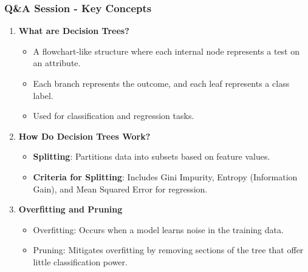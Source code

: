 \documentclass[aspectratio=169]{beamer}
\begin{document}
\begin{frame}[fragile]
    \frametitle{Q\&A Session - Key Concepts}
    \begin{enumerate}
        \item \textbf{What are Decision Trees?}
        \begin{itemize}
            \item A flowchart-like structure where each internal node represents a test on an attribute.
            \item Each branch represents the outcome, and each leaf represents a class label.
            \item Used for classification and regression tasks.
        \end{itemize}
        
        \item \textbf{How Do Decision Trees Work?}
        \begin{itemize}
            \item \textbf{Splitting}: Partitions data into subsets based on feature values.
            \item \textbf{Criteria for Splitting}: Includes Gini Impurity, Entropy (Information Gain), and Mean Squared Error for regression.
        \end{itemize}
        
        \item \textbf{Overfitting and Pruning}
        \begin{itemize}
            \item Overfitting: Occurs when a model learns noise in the training data.
            \item Pruning: Mitigates overfitting by removing sections of the tree that offer little classification power.
        \end{itemize}
    \end{enumerate}
\end{frame}
\end{document}

